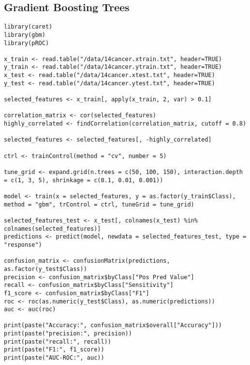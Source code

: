 \documentclass{article}
\begin{document}
\subsection{Gradient Boosting Trees}
\begin{lstlisting}
library(caret)
library(gbm)
library(pROC)

x_train <- read.table("/data/14cancer.xtrain.txt", header=TRUE)
y_train <- read.table("/data/14cancer.ytrain.txt", header=TRUE)
x_test <- read.table("/data/14cancer.xtest.txt", header=TRUE)
y_test <- read.table("/data/14cancer.ytest.txt", header=TRUE)

selected_features <- x_train[, apply(x_train, 2, var) > 0.1]

correlation_matrix <- cor(selected_features)
highly_correlated <- findCorrelation(correlation_matrix, cutoff = 0.8)

selected_features <- selected_features[, -highly_correlated]

ctrl <- trainControl(method = "cv", number = 5)

tune_grid <- expand.grid(n.trees = c(50, 100, 150), interaction.depth = c(1, 3, 5), shrinkage = c(0.1, 0.01, 0.001))

model <- train(x = selected_features, y = as.factor(y_train$Class), method = "gbm", trControl = ctrl, tuneGrid = tune_grid)

selected_features_test <- x_test[, colnames(x_test) %in% colnames(selected_features)]
predictions <- predict(model, newdata = selected_features_test, type = "response")

confusion_matrix <- confusionMatrix(predictions, as.factor(y_test$Class))
precision <- confusion_matrix$byClass["Pos Pred Value"]
recall <- confusion_matrix$byClass["Sensitivity"]
f1_score <- confusion_matrix$byClass["F1"]
roc <- roc(as.numeric(y_test$Class), as.numeric(predictions))
auc <- auc(roc)

print(paste("Accuracy:", confusion_matrix$overall["Accuracy"]))
print(paste("precision:", precision))
print(paste("recall:", recall))
print(paste("F1:", f1_score))
print(paste("AUC-ROC:", auc))
\end{lstlisting}
\newpage
\end{document}
